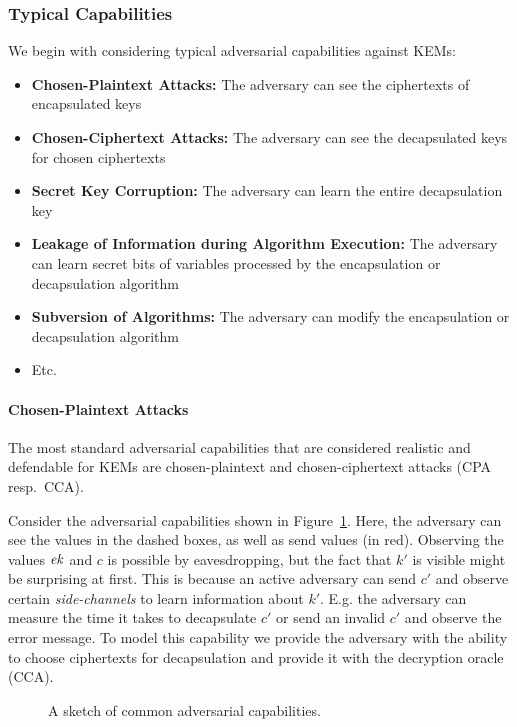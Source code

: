 \subsubsection{Typical Capabilities}
We begin with considering typical adversarial capabilities against KEMs:
\begin{itemize}
    \item \textbf{Chosen-Plaintext Attacks:}
    The adversary can see the ciphertexts of encapsulated keys
    \item \textbf{Chosen-Ciphertext Attacks:}
    The adversary can see the decapsulated keys for chosen ciphertexts
    \item \textbf{Secret Key Corruption:}
    The adversary can learn the entire decapsulation key
    \item \textbf{Leakage of Information during Algorithm Execution:}
    The adversary can learn secret bits of variables processed by the encapsulation or decapsulation algorithm
    \item \textbf{Subversion of Algorithms:}
    The adversary can modify the encapsulation or decapsulation algorithm
    \item Etc.
\end{itemize}

\paragraph{Chosen-Plaintext Attacks}
The most standard adversarial capabilities that are considered realistic and defendable for KEMs are chosen-plaintext and chosen-ciphertext attacks (CPA resp.\ CCA).

Consider the adversarial capabilities shown in Figure~\ref{fig:adv_capabilities}.
Here, the adversary can see the values in the dashed boxes, as well as send values (in red).
Observing the values $\mathit{ek}$ and $c$ is possible by eavesdropping, but the fact that $k'$ is visible might be surprising at first.
This is because an active adversary can send $c'$ and observe certain \emph{side-channels} to learn information about $k'$.
E.g. the adversary can measure the time it takes to decapsulate $c'$ or send an invalid $c'$ and observe the error message.
To model this capability we provide the adversary with the ability to choose ciphertexts for decapsulation and provide it with the decryption oracle (CCA).

\begin{figure}[!ht]
    \centering
    \caption{%
        A sketch of common adversarial capabilities.
    }
    \label{fig:adv_capabilities}
\end{figure}

